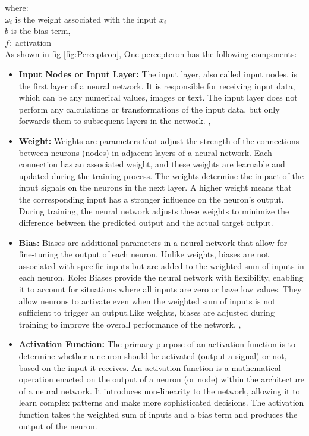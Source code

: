 where:\\
$\omega_{i}$ is the weight associated with the input \(x_{i}\)\\
\(b\) is the bias term,\\
\(f:\) activation\\
As shown in fig \ref{fig:Perceptron}, One percepteron has the following components: \\
\begin{itemize}
    \item \textbf{Input Nodes or Input Layer: }  
    The input layer, also called input nodes, is the first layer of a neural network. It is responsible for receiving input data, which can be any numerical values, images or text. The input layer does not perform any calculations or transformations of the input data, but only forwards them to subsequent layers in the network. \cite{ansari2020building}, \cite{nielsen2015neural}\\
    \item \textbf{Weight: } Weights are parameters that adjust the strength of the connections between neurons (nodes) in adjacent layers of a neural network. Each connection has an associated weight, and these weights are learnable and updated during the training process. The weights determine the impact of the input signals on the neurons in the next layer. A higher weight means that the corresponding input has a stronger influence on the neuron's output. During training, the neural network adjusts these weights to minimize the difference between the predicted output and the actual target output. \\
    \item \textbf{Bias: } Biases are additional parameters in a neural network that allow for fine-tuning the output of each neuron. Unlike weights, biases are not associated with specific inputs but are added to the weighted sum of inputs in each neuron.
    Role: Biases provide the neural network with flexibility, enabling it to account for situations where all inputs are zero or have low values. They allow neurons to activate even when the weighted sum of inputs is not sufficient to trigger an output.Like weights, biases are adjusted during training to improve the overall performance of the network. \cite{ansari2020building}, \cite{nielsen2015neural}\\
    \item \textbf{Activation Function: } The primary purpose of an activation function is to determine whether a neuron should be activated (output a signal) or not, based on the input it receives.
    An activation function is a mathematical operation enacted on the output of a neuron (or node) within the architecture of a neural network. It introduces non-linearity to the network, allowing it to learn complex patterns and make more sophisticated decisions. The activation function takes the weighted sum of inputs and a bias term and produces the output of the neuron.\cite{nielsen2015neural}

\end{itemize}
